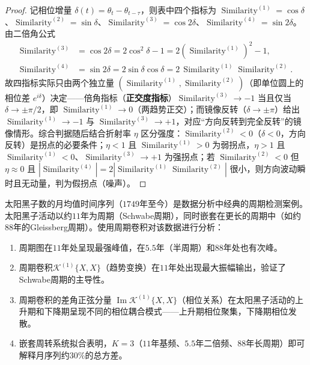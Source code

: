 \begin{proof}
记相位增量 $\delta(t) = \theta_t - \theta_{t-\tau}$，则表中四个指标为 $\operatorname{Similarity}^{(1)} = \cos\delta$、$\operatorname{Similarity}^{(2)} = \sin\delta$、$\operatorname{Similarity}^{(3)} = \cos 2\delta$、$\operatorname{Similarity}^{(4)} = \sin 2\delta$。由二倍角公式
\[
\begin{aligned}
\operatorname{Similarity}^{(3)} &= \cos 2\delta = 2\cos^2\delta - 1 = 2(\operatorname{Similarity}^{(1)})^2 - 1, \\
\operatorname{Similarity}^{(4)} &= \sin 2\delta = 2\sin\delta\cos\delta = 2\,\operatorname{Similarity}^{(1)}\operatorname{Similarity}^{(2)}.
\end{aligned}
\]
故四指标实际只由两个独立量 $(\operatorname{Similarity}^{(1)}, \operatorname{Similarity}^{(2)})$（即单位圆上的相位差 $e^{i\delta}$）决定——倍角指标（\textbf{正交度指标}）$\operatorname{Similarity}^{(3)} \to -1$ 当且仅当 $\delta \to \pm\pi/2$，即 $\operatorname{Similarity}^{(1)} \to 0$（两趋势正交）；而镜像反转（$\delta \to \pm\pi$）给出 $\operatorname{Similarity}^{(1)} \to -1$ 与 $\operatorname{Similarity}^{(3)} \to +1$，对应“方向反转到完全反转”的镜像情形。综合判据随后结合折射率 $\eta$ 区分强度：$\operatorname{Similarity}^{(2)} < 0$（$\delta < 0$，方向反转）是拐点的必要条件；$\eta < 1$ 且 $\operatorname{Similarity}^{(1)} > 0$ 为弱拐点，$\eta > 1$ 且 $\operatorname{Similarity}^{(1)} < 0$、$\operatorname{Similarity}^{(3)} \to +1$ 为强拐点；若 $\operatorname{Similarity}^{(2)} < 0$ 但 $\eta \approx 0$ 且 $|\operatorname{Similarity}^{(4)}| = 2|\operatorname{Similarity}^{(1)}\operatorname{Similarity}^{(2)}|$ 很小，则方向波动瞬时且无动量，判为假拐点（噪声）。
\end{proof}

\begin{example}[太阳黑子数据的周期分析]\label{ex:sunspot_analysis}
太阳黑子数的月均值时间序列（$1749$年至今）是数据分析中经典的周期检测案例。太阳黑子活动以约$11$年为周期（Schwabe周期），同时嵌套在更长的周期中（如约$88$年的Gleissberg周期）。使用周期卷积对该数据进行分析：
\begin{enumerate}[label=(\roman*)]
    \item 周期图在$11$年处呈现最强峰值，在$5.5$年（半周期）和$88$年处也有次峰。
    \item 周期卷积$\mathcal{K}^{(1)}\{X, X\}$（趋势变换）在$11$年处出现最大振幅输出，验证了Schwabe周期的主导性。
    \item 周期卷积的差角正弦分量 $\operatorname{Im}\mathcal{K}^{(1)}\{X, X\}$（相位关系）在太阳黑子活动的上升期和下降期呈现不同的相位耦合模式——上升期相位聚集，下降期相位发散。
    \item 嵌套周转系统拟合表明，$K=3$（$11$年基频、$5.5$年二倍频、$88$年长周期）即可解释月序列约$30\%$的总方差。
\end{enumerate}
\end{example}

